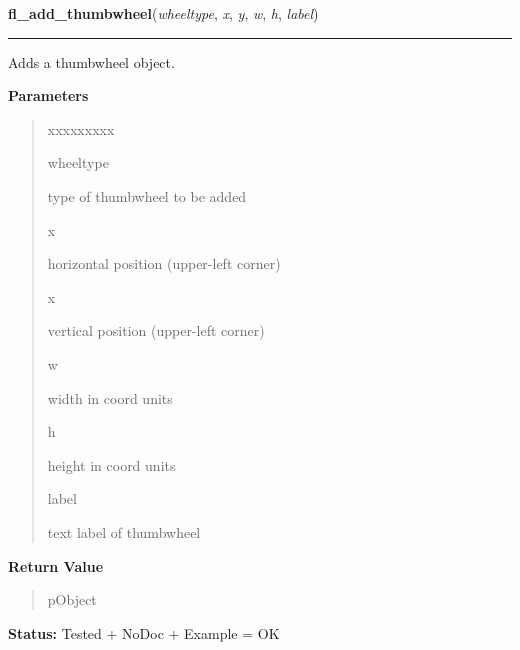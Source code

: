    \label{xformslib:library:fl_add_thumbwheel}

    \vspace{0.5ex}

\hspace{.8\funcindent}\begin{boxedminipage}{\funcwidth}

    \raggedright \textbf{fl\_add\_thumbwheel}(\textit{wheeltype}, \textit{x}, \textit{y}, \textit{w}, \textit{h}, \textit{label})

    \vspace{-1.5ex}

    \rule{\textwidth}{0.5\fboxrule}
\setlength{\parskip}{2ex}
    Adds a thumbwheel object.

\setlength{\parskip}{1ex}
      \textbf{Parameters}
      \vspace{-1ex}

      \begin{quote}
        \begin{Ventry}{xxxxxxxxx}

          \item[wheeltype]

          type of thumbwheel to be added

          \item[x]

          horizontal position (upper-left corner)

          \item[x]

          vertical position (upper-left corner)

          \item[w]

          width in coord units

          \item[h]

          height in coord units

          \item[label]

          text label of thumbwheel

        \end{Ventry}

      \end{quote}

      \textbf{Return Value}
    \vspace{-1ex}

      \begin{quote}
      pObject

      \end{quote}

\textbf{Status:} Tested + NoDoc + Example = OK



    \end{boxedminipage}

